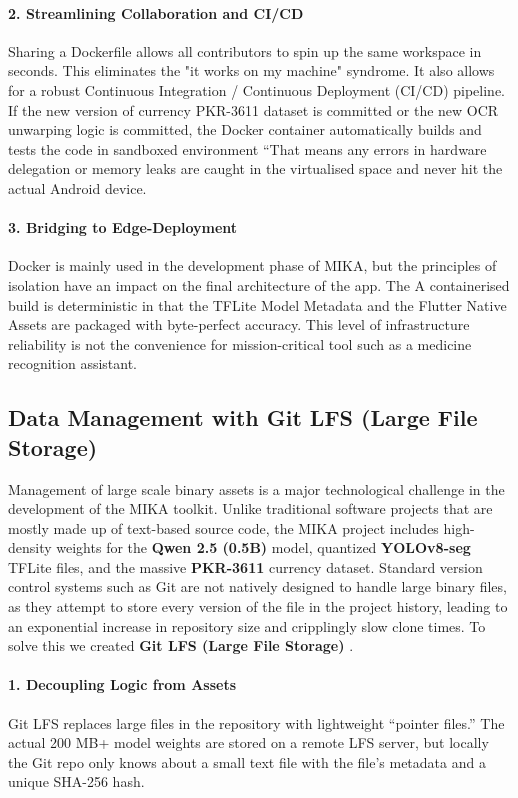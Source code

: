 \documentclass[12pt,a4paper]{report}
\begin{document}
\paragraph{2. Streamlining Collaboration and CI/CD}
Sharing a Dockerfile allows all contributors to spin up the same workspace in seconds. This eliminates the "it works on my machine" syndrome. It also allows for a robust Continuous Integration / Continuous Deployment (CI/CD) pipeline. If the new version of currency PKR-3611 dataset is committed or the new OCR unwarping logic is committed, the Docker container automatically builds and tests the code in sandboxed environment “That means any errors in hardware delegation or memory leaks are caught in the virtualised space and never hit the actual Android device. 

\paragraph{3. Bridging to Edge-Deployment}
Docker is mainly used in the development phase of MIKA, but the principles of isolation have an impact on the final architecture of the app. The A containerised build is deterministic in that the TFLite Model Metadata and the Flutter Native Assets are packaged with byte-perfect accuracy. This level of infrastructure reliability is not the convenience for mission-critical tool such as a medicine recognition assistant.

\subsection{Data Management with Git LFS (Large File Storage)}
 
Management of large scale binary assets is a major technological challenge in the development of the MIKA toolkit. Unlike traditional software projects that are mostly made up of text-based source code, the MIKA project includes high-density weights for the \textbf{Qwen 2.5 (0.5B)} model, quantized \textbf{YOLOv8-seg} TFLite files, and the massive \textbf{PKR-3611} currency dataset. Standard version control systems such as Git are not natively designed to handle large binary files, as they attempt to store every version of the file in the project history, leading to an exponential increase in repository size and cripplingly slow clone times. To solve this we created \textbf{Git LFS (Large File Storage)} .

\paragraph{1. Decoupling Logic from Assets}
Git LFS replaces large files in the repository with lightweight “pointer files.” The actual 200 MB+ model weights are stored on a remote LFS server, but locally the Git repo only knows about a small text file with the file’s metadata and a unique SHA-256 hash. 
\end{document}
